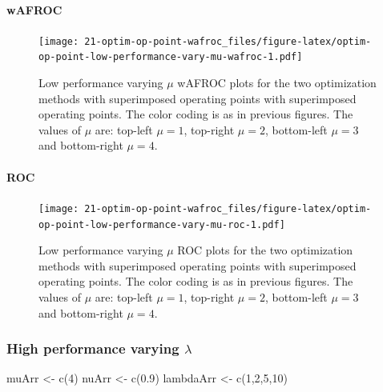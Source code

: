 \documentclass[
]{book}
\newenvironment{Shaded}{\begin{snugshade}}{\end{snugshade}}
\newcommand{\DecValTok}[1]{\textcolor[rgb]{0.00,0.00,0.81}{#1}}
\newcommand{\FloatTok}[1]{\textcolor[rgb]{0.00,0.00,0.81}{#1}}
\newcommand{\FunctionTok}[1]{\textcolor[rgb]{0.00,0.00,0.00}{#1}}
\newcommand{\NormalTok}[1]{#1}
\newcommand{\OtherTok}[1]{\textcolor[rgb]{0.56,0.35,0.01}{#1}}
\begin{document}
\hypertarget{wafroc-6}{%
\paragraph{wAFROC}\label{wafroc-6}}

\begin{figure}
\centering
\texttt{[image: 21-optim-op-point-wafroc\_files/figure-latex/optim-op-point-low-performance-vary-mu-wafroc-1.pdf]}
\caption{\label{fig:optim-op-point-low-performance-vary-mu-wafroc}Low performance varying \(\mu\) wAFROC plots for the two optimization methods with superimposed operating points with superimposed operating points. The color coding is as in previous figures. The values of \(\mu\) are: top-left \(\mu = 1\), top-right \(\mu = 2\), bottom-left \(\mu = 3\) and bottom-right \(\mu = 4\).}
\end{figure}

\hypertarget{roc-6}{%
\paragraph{ROC}\label{roc-6}}

\begin{figure}
\centering
\texttt{[image: 21-optim-op-point-wafroc\_files/figure-latex/optim-op-point-low-performance-vary-mu-roc-1.pdf]}
\caption{\label{fig:optim-op-point-low-performance-vary-mu-roc}Low performance varying \(\mu\) ROC plots for the two optimization methods with superimposed operating points with superimposed operating points. The color coding is as in previous figures. The values of \(\mu\) are: top-left \(\mu = 1\), top-right \(\mu = 2\), bottom-left \(\mu = 3\) and bottom-right \(\mu = 4\).}
\end{figure}

\hypertarget{optim-op-point-high-performance-vary-lambda}{%
\subsubsection{\texorpdfstring{High performance varying \(\lambda\)}{High performance varying \textbackslash lambda}}\label{optim-op-point-high-performance-vary-lambda}}

\begin{Shaded}
\begin{Highlighting}[]
\NormalTok{muArr }\OtherTok{\textless{}{-}} \FunctionTok{c}\NormalTok{(}\DecValTok{4}\NormalTok{)}
\NormalTok{nuArr }\OtherTok{\textless{}{-}} \FunctionTok{c}\NormalTok{(}\FloatTok{0.9}\NormalTok{)}
\NormalTok{lambdaArr }\OtherTok{\textless{}{-}} \FunctionTok{c}\NormalTok{(}\DecValTok{1}\NormalTok{,}\DecValTok{2}\NormalTok{,}\DecValTok{5}\NormalTok{,}\DecValTok{10}\NormalTok{)}
\end{Highlighting}
\end{Shaded}
\end{document}
